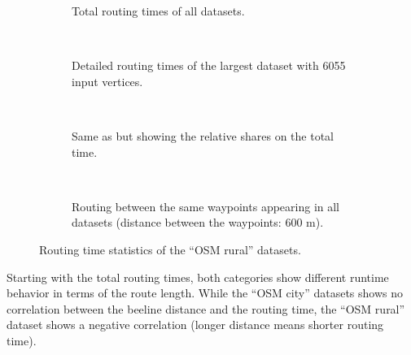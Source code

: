 			\clearpage
			\begin{figure}[h!]
				\begin{figcenter}
					\begin{subfigure}[t]{\textwidth}
						\begin{figcenter}
							
						\end{figcenter}
						\caption{Total routing times of all datasets.}
					\end{subfigure}
					\\[3ex]
					\begin{subfigure}[t]{\textwidth}
						\begin{figcenter}
							
						\end{figcenter}
						\caption{Detailed routing times of the largest dataset with 6055 input vertices.}
						\label{fig:eval-rural-routing-details-b}
					\end{subfigure}
					\\[3ex]
					\begin{subfigure}[t]{\textwidth}
						\begin{figcenter}
							
						\end{figcenter}
						\caption{Same as  but showing the relative shares on the total time.}
					\end{subfigure}
					\\[3ex]
					\begin{subfigure}[t]{\textwidth}
						\begin{figcenter}
							
						\end{figcenter}
						\caption{Routing between the same waypoints appearing in all datasets (distance between the waypoints: 600 m).}
					\end{subfigure}
				\end{figcenter}
				\caption{Routing time statistics of the \enquote{OSM rural} datasets.}
				\label{fig:eval-rural-routing-details}
			\end{figure}
			
			Starting with the total routing times, both categories show different runtime behavior in terms of the route length.
			While the \enquote{OSM city} datasets shows no correlation between the beeline distance and the routing time, the \enquote{OSM rural} dataset shows a negative correlation (longer distance means shorter routing time).
			
